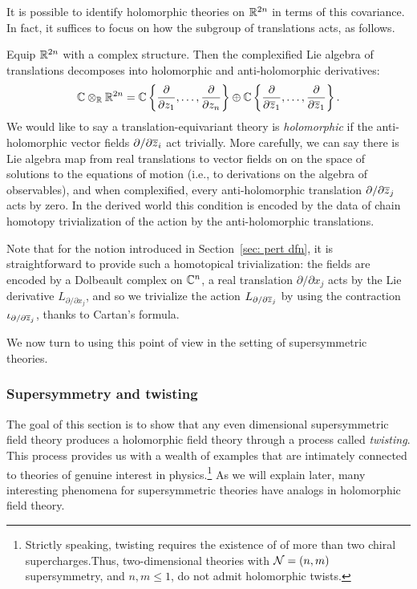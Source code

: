 \documentclass[11pt]{amsart}
\begin{document}
It is possible to identify holomorphic theories on $\mathbb R^{2n}$ in terms of this covariance.
In fact, it suffices to focus on how the subgroup of translations acts, as follows.

Equip $\mathbb R^{2n}$ with a complex structure.
Then the complexified Lie algebra of translations decomposes into holomorphic and anti-holomorphic derivatives:
\[
\mathbb C \otimes_{\mathbb R} \mathbb R^{2n} 
= \mathbb C\left\{\frac{\partial}{\partial z_1}, \ldots, \frac{\partial}{\partial z_n}\right\} 
\oplus \mathbb C\left\{\frac{\partial}{\partial {\overline{z}}_1}, \ldots, \frac{\partial}{\partial {\overline{z}}_1}\right\}.
\]
We would like to say a translation-equivariant theory is {\em holomorphic} if the anti-holomorphic vector fields $\partial / \partial {{\overline{z}}_i}$ act trivially.
More carefully, we can say there is Lie algebra map from real translations to vector fields on on the space of solutions to the equations of motion (i.e., to derivations on the algebra of observables),
and when complexified, every anti-holomorphic translation $\partial/\partial {\overline{z}}_j$ acts by zero.
In the derived world this condition is encoded by the data of chain homotopy trivialization of the action by the anti-holomorphic translations. 

Note that for the notion introduced in Section~\ref{sec: pert dfn},
it is straightforward to provide such a homotopical trivialization: 
the fields are encoded by a Dolbeault complex on $\mathbb C^n$, 
a real translation $\partial/\partial x_j$ acts by the Lie derivative $L_{\partial/\partial x_j}$,
and so we trivialize the action $L_{\partial/\partial {\overline{z}}_j}$ by using the contraction $\iota_{\partial/\partial {\overline{z}}_j}$,
thanks to Cartan's formula.

We now turn to using this point of view in the setting of supersymmetric theories.

\subsubsection{Supersymmetry and twisting}

The goal of this section is to show that any even dimensional supersymmetric field theory produces a holomorphic field theory through a process called {\em twisting}.
This process provides us with a wealth of examples that are intimately connected to theories of genuine interest in physics.\footnote{Strictly speaking, twisting requires the existence of of more than two chiral supercharges.Thus, two-dimensional theories with $\mathcal N = (n,m)$ supersymmetry, and $n,m \leq 1$, do not admit holomorphic twists.}
As we will explain later, many interesting phenomena for supersymmetric theories have analogs in holomorphic field theory.
 
\end{document}
